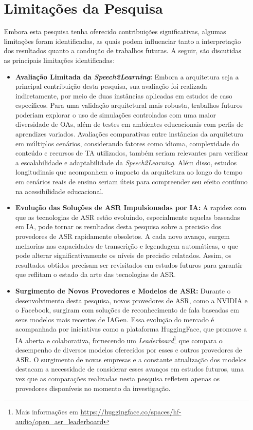 \section{Limitações da Pesquisa}

Embora esta pesquisa tenha oferecido contribuições significativas, algumas limitações foram identificadas, as quais podem influenciar tanto a interpretação dos resultados quanto a condução de trabalhos futuras. A seguir, são discutidas as principais limitações identificadas:

\begin{itemize}

\item \textbf{Avaliação Limitada da \textit{Speech2Learning}:} Embora a arquitetura seja a principal contribuição desta pesquisa, sua avaliação foi realizada indiretamente, por meio de duas instâncias aplicadas em estudos de caso específicos. Para uma validação arquitetural mais robusta,  trabalhos futuros poderiam explorar o uso de simulações controladas com uma maior diversidade de OAs, além de testes em ambientes educacionais com perfis de aprendizes variados. Avaliações comparativas entre instâncias da arquitetura em múltiplos cenários, considerando fatores como idioma, complexidade do conteúdo e recursos de TA utilizados, também seriam relevantes para verificar a escalabilidade e adaptabilidade da \textit{Speech2Learning}. Além disso, estudos longitudinais que acompanhem o impacto da arquitetura ao longo do tempo em cenários reais de ensino seriam úteis para compreender seu efeito contínuo na acessibilidade educacional.

\item \textbf{Evolução das Soluções de ASR Impulsionadas por IA:} A rapidez com que as tecnologias de ASR estão evoluindo, especialmente aquelas baseadas em IA, pode tornar os resultados desta pesquisa sobre a precisão dos provedores de ASR rapidamente obsoletos. A cada novo avanço, surgem melhorias nas capacidades de transcrição e legendagem automáticas, o que pode alterar significativamente os níveis de precisão relatados. Assim, os resultados obtidos precisam ser revisitados em estudos futuros para garantir que reflitam o estado da arte das tecnologias de ASR.

\item \textbf{Surgimento de Novos Provedores e Modelos de ASR:} Durante o desenvolvimento desta pesquisa, novos provedores de ASR, como a NVIDIA e o Facebook, surgiram com soluções de reconhecimento de fala baseadas em seus modelos mais recentes de IAGen. Essa evolução do mercado é acompanhada por iniciativas como a plataforma HuggingFace, que promove a IA aberta e colaborativa, fornecendo um \textit{Leaderboard}\footnote{Mais informações em \url{https://huggingface.co/spaces/hf-audio/open_asr_leaderboard}} que compara o desempenho de diversos modelos oferecidos por esses e outros provedores de ASR. O surgimento de novas empresas e a constante atualização dos modelos destacam a necessidade de considerar esses avanços em estudos futuros, uma vez que as comparações realizadas nesta pesquisa refletem apenas os provedores disponíveis no momento da investigação.


\end{itemize}
